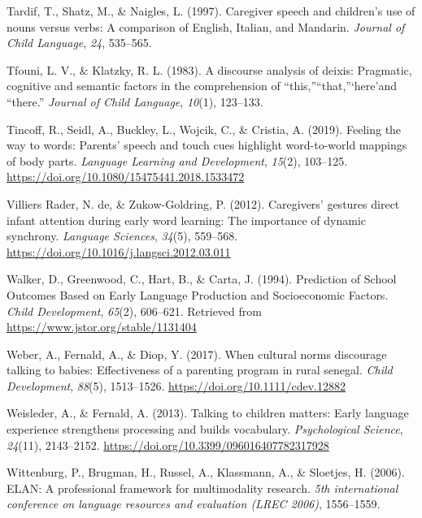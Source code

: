 \documentclass[
  man,floatsintext]{apa6}
\newlength{\cslhangindent}
\newlength{\cslentryspacingunit} %
\newenvironment{CSLReferences}[2] %
 {%
  \setlength{\parindent}{0pt}
  \ifodd #1
  \let\oldpar\par
  \def\par{\hangindent=\cslhangindent\oldpar}
  \fi
  \setlength{\parskip}{#2\cslentryspacingunit}
 }%
 {}
\begin{document}
\begin{CSLReferences}{1}{0}
\leavevmode{}%
Tardif, T., Shatz, M., \& Naigles, L. (1997). Caregiver speech and children's use of nouns versus verbs: A comparison of {English}, {Italian}, and {Mandarin}. \emph{Journal of Child Language}, \emph{24}, 535--565.

\leavevmode{}%
Tfouni, L. V., \& Klatzky, R. L. (1983). A discourse analysis of deixis: Pragmatic, cognitive and semantic factors in the comprehension of {``this,''}{``that,''}`here'and {``there.''} \emph{Journal of Child Language}, \emph{10}(1), 123--133.

\leavevmode{}%
Tincoff, R., Seidl, A., Buckley, L., Wojcik, C., \& Cristia, A. (2019). Feeling the way to words: {Parents}' speech and touch cues highlight word-to-world mappings of body parts. \emph{Language Learning and Development}, \emph{15}(2), 103--125. \url{https://doi.org/10.1080/15475441.2018.1533472}

\leavevmode{}%
Villiers Rader, N. de, \& Zukow-Goldring, P. (2012). Caregivers' gestures direct infant attention during early word learning: The importance of dynamic synchrony. \emph{Language Sciences}, \emph{34}(5), 559--568. \url{https://doi.org/10.1016/j.langsci.2012.03.011}

\leavevmode{}%
Walker, D., Greenwood, C., Hart, B., \& Carta, J. (1994). Prediction of {School} {Outcomes} {Based} on {Early} {Language} {Production} and {Socioeconomic} {Factors}. \emph{Child Development}, \emph{65}(2), 606--621. Retrieved from \url{https://www.jstor.org/stable/1131404}

\leavevmode{}%
Weber, A., Fernald, A., \& Diop, Y. (2017). When cultural norms discourage talking to babies: {Effectiveness} of a parenting program in rural senegal. \emph{Child Development}, \emph{88}(5), 1513--1526. \url{https://doi.org/10.1111/cdev.12882}

\leavevmode{}%
Weisleder, A., \& Fernald, A. (2013). Talking to children matters: {Early} language experience strengthens processing and builds vocabulary. \emph{Psychological Science}, \emph{24}(11), 2143--2152. \url{https://doi.org/10.3399/096016407782317928}

\leavevmode{}%
Wittenburg, P., Brugman, H., Russel, A., Klassmann, A., \& Sloetjes, H. (2006). ELAN: A professional framework for multimodality research. \emph{5th international conference on language resources and evaluation (LREC 2006)}, 1556--1559.


\end{CSLReferences}
\end{document}
